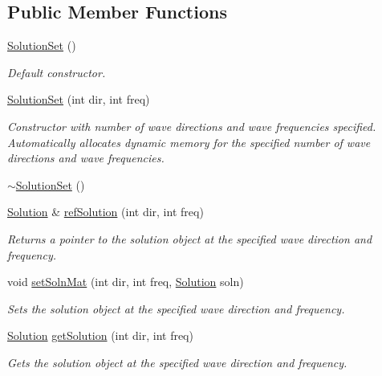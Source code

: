 \subsection*{Public Member Functions}
\begin{DoxyCompactItemize}
\item 
\hypertarget{class_solution_set_a0f7bf3b0ffbc11e1eea127614bf668a4}{\hyperlink{class_solution_set_a0f7bf3b0ffbc11e1eea127614bf668a4}{Solution\-Set} ()}\label{class_solution_set_a0f7bf3b0ffbc11e1eea127614bf668a4}

\begin{DoxyCompactList}\small\item\em Default constructor. \end{DoxyCompactList}\item 
\hyperlink{class_solution_set_ac4a508cd109ea0e7726aa47a3c868814}{Solution\-Set} (int dir, int freq)
\begin{DoxyCompactList}\small\item\em Constructor with number of wave directions and wave frequencies specified. Automatically allocates dynamic memory for the specified number of wave directions and wave frequencies. \end{DoxyCompactList}\item 
\hyperlink{class_solution_set_af016abf25e2e0ba50336449b12b88423}{$\sim$\-Solution\-Set} ()
\item 
\hyperlink{class_solution}{Solution} \& \hyperlink{class_solution_set_a5bbd01ec83ef72d924d13d9437407880}{ref\-Solution} (int dir, int freq)
\begin{DoxyCompactList}\small\item\em Returns a pointer to the solution object at the specified wave direction and frequency. \end{DoxyCompactList}\item 
void \hyperlink{class_solution_set_abfd970f3f5b875cdc193281c4a5f6f21}{set\-Soln\-Mat} (int dir, int freq, \hyperlink{class_solution}{Solution} soln)
\begin{DoxyCompactList}\small\item\em Sets the solution object at the specified wave direction and frequency. \end{DoxyCompactList}\item 
\hyperlink{class_solution}{Solution} \hyperlink{class_solution_set_aef977b8cf522b4d24cdd08df70d372f0}{get\-Solution} (int dir, int freq)
\begin{DoxyCompactList}\small\item\em Gets the solution object at the specified wave direction and frequency. \end{DoxyCompactList}\item 

\end{DoxyCompactItemize}
